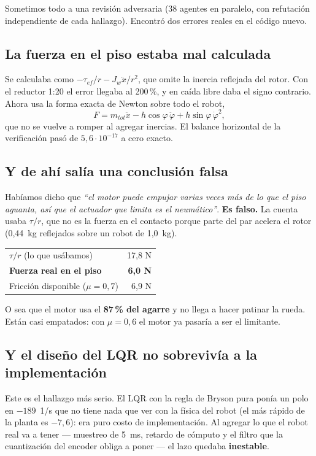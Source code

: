 \documentclass[11pt,a4paper]{article}
\begin{document}
Sometimos todo a una revisión adversaria (38 agentes en paralelo, con refutación independiente de cada
hallazgo). Encontró dos errores reales en el código nuevo.

\subsection*{La fuerza en el piso estaba mal calculada}

Se calculaba como $-\tau_{ef}/r - J_w\ddot x/r^2$, que omite la inercia reflejada del rotor. Con el
reductor 1:20 el error llegaba al 200\,\%, y en caída libre daba el signo contrario. Ahora usa la forma
exacta de Newton sobre todo el robot,
\[
F = m_{tot}\ddot x - h\cos\varphi\,\ddot\varphi + h\sin\varphi\,\dot\varphi^2,
\]
que no se vuelve a romper al agregar inercias. El balance horizontal de la verificación pasó de
$5{,}6\cdot10^{-17}$ a cero exacto.

\subsection*{Y de ahí salía una conclusión falsa}

Habíamos dicho que \emph{``el motor puede empujar varias veces más de lo que el piso aguanta, así que
el actuador que limita es el neumático''}. \textbf{Es falso.} La cuenta usaba $\tau/r$, que no es la
fuerza en el contacto porque parte del par acelera el rotor (0,44~kg reflejados sobre un robot de
1,0~kg).

\begin{center}\small
\begin{tabular}{lr}
\toprule
$\tau/r$ (lo que usábamos) & 17,8 N \\
\textbf{Fuerza real en el piso} & \textbf{6,0 N} \\
Fricción disponible ($\mu = 0{,}7$) & 6,9 N \\
\bottomrule
\end{tabular}
\end{center}

O sea que el motor usa el \textbf{87\,\% del agarre} y no llega a hacer patinar la rueda. Están casi
empatados: con $\mu = 0{,}6$ el motor ya pasaría a ser el limitante.

\subsection*{Y el diseño del LQR no sobrevivía a la implementación}

Este es el hallazgo más serio. El LQR con la regla de Bryson pura ponía un polo en $-189$~1/s que no
tiene nada que ver con la física del robot (el más rápido de la planta es $-7{,}6$): era puro costo de
implementación. Al agregar lo que el robot real va a tener --- muestreo de 5~ms, retardo de cómputo y
el filtro que la cuantización del encoder obliga a poner --- el lazo quedaba \textbf{inestable}.
\end{document}
